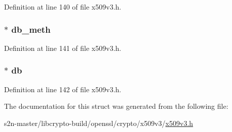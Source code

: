 Definition at line 140 of file x509v3.\+h.

\subsubsection[{\texorpdfstring{db\+\_\+meth}{db_meth}}]{ $\ast$ db\+\_\+meth}\hypertarget{structv3__ext__ctx_a743eafa6e1a556a23c76c4c5636c2260}{}\label{structv3__ext__ctx_a743eafa6e1a556a23c76c4c5636c2260}


Definition at line 141 of file x509v3.\+h.

\subsubsection[{\texorpdfstring{db}{db}}]{ $\ast$ db}\hypertarget{structv3__ext__ctx_a28c211b805ca94c1cbe02a69b934b3af}{}\label{structv3__ext__ctx_a28c211b805ca94c1cbe02a69b934b3af}


Definition at line 142 of file x509v3.\+h.



The documentation for this struct was generated from the following file\+:\begin{DoxyCompactItemize}
\item 
s2n-\/master/libcrypto-\/build/openssl/crypto/x509v3/\hyperlink{crypto_2x509v3_2x509v3_8h}{x509v3.\+h}\end{DoxyCompactItemize}
